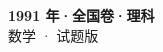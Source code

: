 \documentclass[zihao=-4, a4paper]{ctexart}
\begin{document}
\begin{center}
  {\Large\bfseries 1991 年·全国卷·理科}\\[4pt]
  {\large 数学 · 试题版}
\end{center}
\medskip
{}

\end{document}
